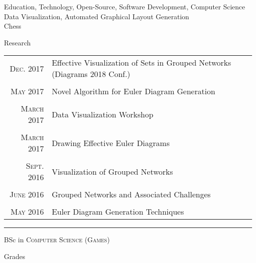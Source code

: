 \documentclass[a4paper,10pt]{article} %
\begin{document}
Education, Technology, Open-Source, Software Development, Computer Science\\
Data Visualization, Automated Graphical Layout Generation\\
Chess\\
\bigskip

\pagebreak


\par{\centering\Large \hypertarget{papers}{Research}\par}

\begin{center}
\begin{tabular}{rl}
\textsc{Dec.} 2017 & Effective Visualization of Sets in Grouped Networks (Diagrams 2018 Conf.) \\
\\
\textsc{May} 2017 & Novel Algorithm for Euler Diagram Generation \\
\\
\textsc{March} 2017 & Data Visualization Workshop \\
\\
\textsc{March} 2017 & Drawing Effective Euler Diagrams \\
\\
\textsc{Sept.} 2016 & Visualization of Grouped Networks \\
\\
\textsc{June} 2016 & Grouped Networks and Associated Challenges \\
\\
\textsc{May} 2016 & Euler Diagram Generation Techniques \\
\end{tabular}
\end{center}
\bigskip
\hrule
\vspace{1cm}


\par{\centering\Large \hypertarget{grds}{BSc in \textsc{Computer Science (Games)}}\par}\large{\centering Grades\par}\normalsize
\end{document}
